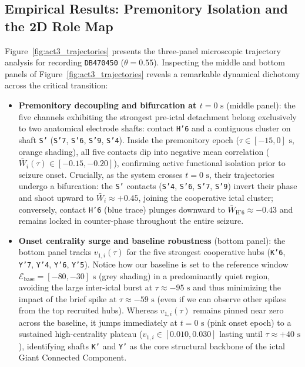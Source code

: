 \subsection{Empirical Results: Premonitory Isolation and the 2D Role Map}
Figure~\ref{fig:act3_trajectories} presents the three-panel microscopic trajectory analysis for recording \texttt{DB470450} ($\theta = 0.55$).
Inspecting the middle and bottom panels of Figure~\ref{fig:act3_trajectories} reveals a remarkable dynamical dichotomy across the critical transition:
\begin{itemize}
    \item \textbf{Premonitory decoupling and bifurcation at $t = 0\text{ s}$} (middle panel): the five channels exhibiting the strongest pre-ictal detachment belong exclusively to two anatomical electrode shafts: contact \texttt{H'6} and a contiguous cluster on shaft \texttt{S'} (\texttt{S'7}, \texttt{S'6}, \texttt{S'9}, \texttt{S'4}). Inside the premonitory epoch ($\tau \in [-15, 0]\text{ s}$, orange shading), all five contacts dip into negative mean correlation ($\bar{W}_i(\tau) \in [-0.15,-0.20]$), confirming active functional isolation prior to seizure onset. Crucially, as the system crosses $t = 0\text{ s}$, their trajectories undergo a bifurcation: the \texttt{S'} contacts (\texttt{S'4}, \texttt{S'6}, \texttt{S'7}, \texttt{S'9}) invert their phase and shoot upward to $\bar{W}_i \approx +0.45$, joining the cooperative ictal cluster; conversely, contact \texttt{H'6} (blue trace) plunges downward to $\bar{W}_{\text{H'6}} \approx -0.43$ and remains locked in counter-phase throughout the entire seizure.
    \item \textbf{Onset centrality surge and baseline robustness} (bottom panel): the bottom panel tracks $v_{1,i}(\tau)$ for the five strongest cooperative hubs (\texttt{K'6}, \texttt{Y'7}, \texttt{Y'4}, \texttt{Y'6}, \texttt{Y'5}). Notice how our baseline is set to the reference window $\mathcal{E}_{\text{base}} = [-80, -30]\text{ s}$ (grey shading) in a predominantly quiet region, avoiding the large inter-ictal burst at $\tau \approx -95\text{ s}$ and thus minimizing the impact of the brief spike at $\tau \approx -59\text{ s}$ (even if we can observe other spikes from the top recruited hubs). Whereas $v_{1,i}(\tau)$ remains pinned near zero across the baseline, it jumps immediately at $t = 0\text{ s}$ (pink onset epoch) to a sustained high-centrality plateau ($v_{1,i} \in [0.010, 0.030]$ lasting until $\tau \approx +40\text{ s}$), identifying shafts \texttt{K'} and \texttt{Y'} as the core structural backbone of the ictal Giant Connected Component.
\end{itemize}

